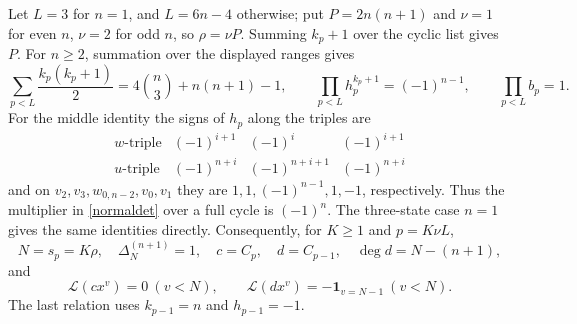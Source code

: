 \documentclass[11pt,a4paper]{article}
\newcommand{\D}[2]{\Delta_{#1}^{(#2)}}
\begin{document}
Let $L=3$ for $n=1$, and $L=6n-4$ otherwise; put
$P=2n(n+1)$ and $\nu=1$ for even $n$, $\nu=2$ for odd $n$, so
$\rho=\nu P$. Summing $k_p+1$ over the cyclic list gives $P$.
For $n\ge2$, summation over the displayed ranges gives
\[
 \sum_{p<L}\frac{k_p(k_p+1)}2=4\binom n3+n(n+1)-1,\qquad
 \prod_{p<L}h_p^{k_p+1}=(-1)^{n-1},\qquad \prod_{p<L}b_p=1.
\]
For the middle identity the signs of $h_p$ along the triples are
\[
 \begin{array}{c|ccc}
 w\text{-triple}&(-1)^{i+1}&(-1)^i&(-1)^{i+1}\\
 u\text{-triple}&(-1)^{n+i}&(-1)^{n+i+1}&(-1)^{n+i}
 \end{array}
\]
and on $v_2,v_3,w_{0,n-2},v_0,v_1$ they are
$1,1,(-1)^{n-1},1,-1$, respectively.
Thus the multiplier in \eqref{normaldet} over a full cycle is $(-1)^n$.
The three-state case $n=1$ gives the same identities directly.
Consequently, for $K\ge1$ and $p=K\nu L$,
\begin{equation}\label{normal}
 N=s_p=K\rho,\quad \D N{n+1}=1,\quad
 c=C_p,\quad d=C_{p-1},\quad \deg d=N-(n+1),
\end{equation}
and
\begin{equation}\label{orth}
 \mathcal L(cx^v)=0\ (v<N),\qquad
 \mathcal L(dx^v)=-\mathbf1_{v=N-1}\ (v<N).
\end{equation}
The last relation uses $k_{p-1}=n$ and $h_{p-1}=-1$.
\end{document}
